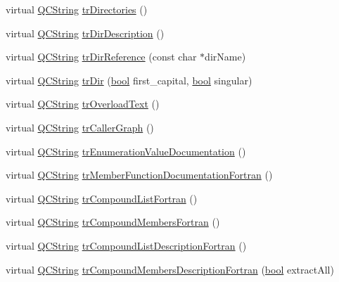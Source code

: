 \begin{DoxyCompactItemize}
virtual \hyperlink{class_q_c_string}{Q\+C\+String} \hyperlink{class_translator_greek_a1ee5ab25e11186483ca236f6b2cfcdff}{tr\+Directories} ()
\item 
virtual \hyperlink{class_q_c_string}{Q\+C\+String} \hyperlink{class_translator_greek_a2410b2b5234092224fee5b9ff94df61d}{tr\+Dir\+Description} ()
\item 
virtual \hyperlink{class_q_c_string}{Q\+C\+String} \hyperlink{class_translator_greek_abb0762b1cb35511608e640a6c12dbb84}{tr\+Dir\+Reference} (const char $\ast$dir\+Name)
\item 
virtual \hyperlink{class_q_c_string}{Q\+C\+String} \hyperlink{class_translator_greek_ab1793dde0ab01b6db9ad15658de398f5}{tr\+Dir} (\hyperlink{qglobal_8h_a1062901a7428fdd9c7f180f5e01ea056}{bool} first\+\_\+capital, \hyperlink{qglobal_8h_a1062901a7428fdd9c7f180f5e01ea056}{bool} singular)
\item 
virtual \hyperlink{class_q_c_string}{Q\+C\+String} \hyperlink{class_translator_greek_a50bb4aebcb733c3c1f2427cdb17ea186}{tr\+Overload\+Text} ()
\item 
virtual \hyperlink{class_q_c_string}{Q\+C\+String} \hyperlink{class_translator_greek_aeee0da136977509024184c1bd8a138e3}{tr\+Caller\+Graph} ()
\item 
virtual \hyperlink{class_q_c_string}{Q\+C\+String} \hyperlink{class_translator_greek_a2cf94f7118f6f7a7cca9e4b74de74633}{tr\+Enumeration\+Value\+Documentation} ()
\item 
virtual \hyperlink{class_q_c_string}{Q\+C\+String} \hyperlink{class_translator_greek_a40aa92ad0e860be1ca884aedfcbc7af7}{tr\+Member\+Function\+Documentation\+Fortran} ()
\item 
virtual \hyperlink{class_q_c_string}{Q\+C\+String} \hyperlink{class_translator_greek_ad4920d1174a3b7b4eaca8daa3fb3d12a}{tr\+Compound\+List\+Fortran} ()
\item 
virtual \hyperlink{class_q_c_string}{Q\+C\+String} \hyperlink{class_translator_greek_afa4cafc980d744e0a9500def6edb6ba6}{tr\+Compound\+Members\+Fortran} ()
\item 
virtual \hyperlink{class_q_c_string}{Q\+C\+String} \hyperlink{class_translator_greek_a7f4b66ce35a016c70795c10795165241}{tr\+Compound\+List\+Description\+Fortran} ()
\item 
virtual \hyperlink{class_q_c_string}{Q\+C\+String} \hyperlink{class_translator_greek_a3f5a79f73690b4aad02b63b77cad5e11}{tr\+Compound\+Members\+Description\+Fortran} (\hyperlink{qglobal_8h_a1062901a7428fdd9c7f180f5e01ea056}{bool} extract\+All)
\item 

\end{DoxyCompactItemize}
